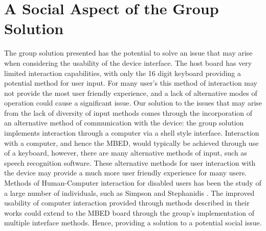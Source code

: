 \section{A Social Aspect of the Group Solution} 

The group solution presented has the potential to solve an issue that may arise 
when considering the usability of the device interface.
The host board has very limited interaction capabilities, with only the 16 digit 
keyboard providing a potential method for user input.
For many user's this method of interaction may not provide the most user friendly 
experience, and a lack of alternative modes of operation could cause  a 
significant issue.
Our solution to the issues that may arise from the lack of diversity of input 
methods comes through the incorporation of an alternative method of communication
with the device: the group solution implements interaction through a computer 
via a shell style interface.
Interaction with a computer, and hence the MBED, would typically be achieved 
through use of a keyboard, however, there are many alternative methods of input, 
such as speech recognition software. 
These alternative methods for user interaction with the device may provide a 
much more user friendly experience for many users. 
Methods of Human-Computer interaction for disabled users has been the study of 
a large number of individuals, such as Simpson and Stephanidis 
\cite{disabled-book, disabled-book2}. The improved usability of computer 
interaction provided through methods described in their works could extend to the 
MBED board through the group's implementation of multiple interface methods.
Hence, providing a solution to a potential social issue. 
